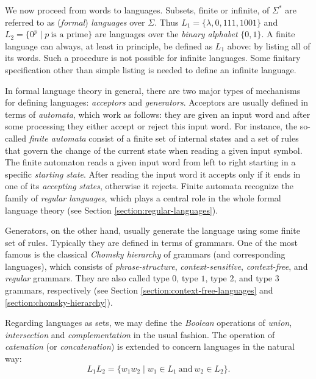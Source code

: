 We now proceed from words to languages. Subsets, finite or infinite, of $\Sigma^*$ are referred to as (\emph{formal}) \emph{languages} over $\Sigma$. Thus $L_1 = \{\lambda, 0, 111, 1001\}$ and $L_2 = \{0^p \mid p \ \text{is a prime}\}$ are languages over the \emph{binary alphabet} $\{0, 1\}$. A finite language can always, at least in principle, be defined as $L_1$ above: by listing all of its words. Such a procedure is not possible for infinite languages. Some finitary specification other than simple listing is needed to define an infinite language. 

In formal language theory in general, there are two major types of mechanisms for defining languages: \emph{acceptors} and \emph{generators}. Acceptors are usually defined in terms of \emph{automata}, which work as follows: they are given an input word and after some processing they either accept or reject this input word. For instance, the so-called \emph{finite automata} consist of a finite set of internal states and a set of rules that govern the change of the current state when reading a given input symbol. The finite automaton reads a given input word from left to right starting in a specific \emph{starting state}. After reading the input word it accepts only if it ends in one of its \emph{accepting states}, otherwise it rejects. Finite automata recognize the family of \emph{regular languages}, which plays a central role in the whole formal language theory (see Section \ref{section:regular-languages}).

Generators, on the other hand, usually generate the language using some finite set of rules. Typically they are defined in terms of grammars. One of the most famous is the classical \emph{Chomsky hierarchy} of grammars (and corresponding languages), which consists of \emph{phrase-structure}, \emph{context-sensitive}, \emph{context-free}, and \emph{regular} grammars. They are also called type $0$, type $1$, type $2$, and type $3$ grammars, respectively (see Section \ref{section:context-free-languages} and \ref{section:chomsky-hierarchy}).

Regarding languages as sets, we may define the \emph{Boolean} operations of \emph{union}, \emph{intersection} and \emph{complementation} in the usual fashion. The operation of \emph{catenation} (or \emph{concatenation}) is extended to concern languages in the natural way: $$L_1 L_2 = \{w_1 w_2 \mid w_1 \in L_1 \ \text{and} \ w_2 \in L_2\}.$$

